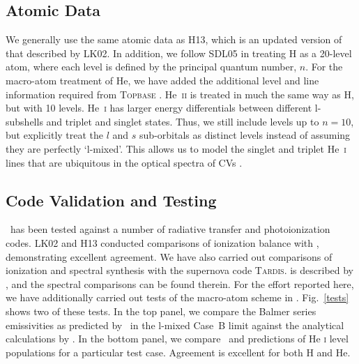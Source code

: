 \documentclass[preprint, a4paper, 11pt]{aastex}
\begin{document}
\subsection{Atomic Data}
\label{sec:data}

We generally use the same atomic data as H13, which is an updated
version of that described by LK02. In addition, we follow SDL05 in
treating H as a 20-level atom, where each level is defined by
the principal quantum number, $n$. For the macro-atom treatment of
He, we have added the additional level and line information required 
from \textsc{Topbase} \citep{topbase2005}.  He~\textsc{ii} is treated
in much the same way as H, but with 10 levels. He~\textsc{i} has
larger energy differentials between different l-subshells and triplet
and singlet states. Thus, we still include levels up to $n=10$, but
explicitly treat the $l$ and $s$ sub-orbitals as distinct levels
instead of assuming they are perfectly `l-mixed'. This allows us
to model the singlet and  triplet He~\textsc{i} lines that are ubiquitous
in the optical spectra of CVs \citep[e.g.][]{dhillon1996}.


\subsection{Code Validation and Testing}

\py\ has been tested against a number of radiative transfer and
photoionization codes. LK02 and H13 conducted comparisons of 
ionization balance  with \cld \citep{cloudy2013}, demonstrating
excellent agreement. We have also carried out comparisons
of ionization and spectral synthesis with the supernova code
\textsc{Tardis.} \tar is described by 
\cite{kerzendorfsim}, and the spectral comparisons can be found
therein. For the effort reported here, we have additionally carried
out tests of the macro-atom scheme in \py. Fig.~\ref{tests} shows
two of these tests. In the top panel, we compare the Balmer series 
emissivities as predicted by \py\ in the l-mixed Case~B limit against the
analytical calculations by \cite{seaton1959}. In the bottom panel, we
compare \py\ and \tar predictions of  He \textsc{i} level populations
for a particular test case. Agreement is excellent for both H and He.
\end{document}
